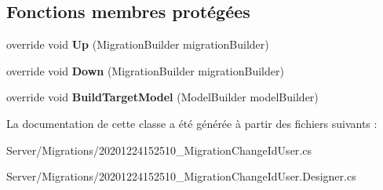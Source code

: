 \subsection*{Fonctions membres protégées}
\begin{DoxyCompactItemize}
\item 
\mbox{\label{class_mediwatch_1_1_server_1_1_migrations_1_1_migration_change_id_user_a5416ab1301818531fae0a3bc3704f9ce}} 
override void {\bfseries Up} (Migration\+Builder migration\+Builder)
\item 
\mbox{\label{class_mediwatch_1_1_server_1_1_migrations_1_1_migration_change_id_user_a86f497448b9e0a91e2aba2be4a183a4b}} 
override void {\bfseries Down} (Migration\+Builder migration\+Builder)
\item 
\mbox{\label{class_mediwatch_1_1_server_1_1_migrations_1_1_migration_change_id_user_a1bf8d925640d36f0d81655e4a6054e9b}} 
override void {\bfseries Build\+Target\+Model} (Model\+Builder model\+Builder)
\end{DoxyCompactItemize}


La documentation de cette classe a été générée à partir des fichiers suivants \+:\begin{DoxyCompactItemize}
\item 
Server/\+Migrations/20201224152510\+\_\+\+Migration\+Change\+Id\+User.\+cs\item 
Server/\+Migrations/20201224152510\+\_\+\+Migration\+Change\+Id\+User.\+Designer.\+cs\end{DoxyCompactItemize}
